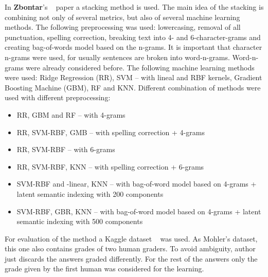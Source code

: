 In \textbf{Zbontar}'s ~\cite{Zbontar} paper a stacking method is used. The main idea of the stacking is combining not only of several metrics, but also of several machine learning methods. The following preprocessing was used: lowercasing, removal of all punctuation, spelling correction, breaking text into 4- and 6-character-grams and creating bag-of-words model based on the n-grams. It is important that character n-grams were used, for usually sentences are broken into word-n-grams. Word-n-grams were already considered before. The following machine learning methods were used: Ridge Regression (RR), SVM -- with lineal and RBF kernels, Gradient Boosting Machine (GBM), RF and KNN. Different combination of methods were used with different preprocessing:
\begin{itemize}
\item RR, GBM and RF -- with 4-grams
\item RR, SVM-RBF, GMB -- with spelling correction + 4-grams
\item RR, SVM-RBF -- with 6-grams
\item RR, SVM-RBF, KNN -- with spelling correction + 6-grams
\item SVM-RBF and -linear, KNN -- with bag-of-word model based on 4-grams + latent semantic indexing with 200 components
\item SVM-RBF, GBR, KNN -- with bag-of-word model based on 4-grams + latent semantic indexing with 500 components
\end{itemize}

For evaluation of the method a Kaggle dataset ~\cite{kaggleSas} was used. As Mohler's dataset, this one also contains grades of two human graders. To avoid ambiguity, author just discards the answers graded differently. For the rest of the answers only the grade given by the first human was considered for the learning.\\

